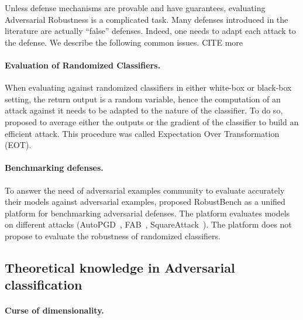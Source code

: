 Unless defense mechanisms are provable and have guarantees, evaluating Adversarial Robustness is a complicated task. Many  defenses introduced in the literature are actually ``false'' defenses. Indeed, one needs to adapt each attack to the defense. We describe the following common issues. CITE more

\paragraph{Evaluation of Randomized Classifiers.} When evaluating against randomized classifiers in either white-box or black-box setting, the return output is a random variable, hence the computation of an attack against it needs to be adapted to the nature of the classifier. To do so, \cite{athalye2018obfuscated} proposed to average either the outputs or the gradient of the classifier to build an efficient attack. This procedure was called Expectation Over Transformation (EOT).

\paragraph{Benchmarking defenses.} To answer the need of adversarial examples community to evaluate accurately their models against adversarial examples, \cite{croce2020robustbench} proposed RobustBench as a unified platform for benchmarking adversarial defenses. The platform evaluates models on different attacks (AutoPGD~\citep{Croce2020ReliableEO}, FAB~\citep{Croce2020MinimallyDA}, SquareAttack~\citep{andriushchenko2019square}). The platform  does not propose to evaluate the robustness of randomized classifiers. 

\subsection{Theoretical knowledge in Adversarial classification}


\paragraph{Curse of dimensionality.}





\paragraph{}